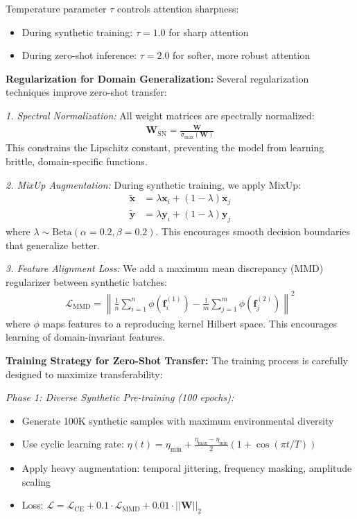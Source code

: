 \documentclass[journal]{IEEEtran}
\begin{document}
Temperature parameter $\tau$ controls attention sharpness:
\begin{itemize}
\item During synthetic training: $\tau = 1.0$ for sharp attention
\item During zero-shot inference: $\tau = 2.0$ for softer, more robust attention
\end{itemize}

\textbf{Regularization for Domain Generalization:}
Several regularization techniques improve zero-shot transfer:

\textit{1. Spectral Normalization:} All weight matrices are spectrally normalized:
\begin{align}
\mathbf{W}_{\text{SN}} = \frac{\mathbf{W}}{\sigma_{\max}(\mathbf{W})}
\end{align}
This constrains the Lipschitz constant, preventing the model from learning brittle, domain-specific functions.

\textit{2. MixUp Augmentation:} During synthetic training, we apply MixUp:
\begin{align}
\tilde{\mathbf{x}} &= \lambda \mathbf{x}_i + (1-\lambda) \mathbf{x}_j \\
\tilde{\mathbf{y}} &= \lambda \mathbf{y}_i + (1-\lambda) \mathbf{y}_j
\end{align}
where $\lambda \sim \text{Beta}(\alpha=0.2, \beta=0.2)$. This encourages smooth decision boundaries that generalize better.

\textit{3. Feature Alignment Loss:} We add a maximum mean discrepancy (MMD) regularizer between synthetic batches:
\begin{align}
\mathcal{L}_{\text{MMD}} = \left\| \frac{1}{n}\sum_{i=1}^n \phi(\mathbf{f}_i^{(1)}) - \frac{1}{m}\sum_{j=1}^m \phi(\mathbf{f}_j^{(2)}) \right\|^2
\end{align}
where $\phi$ maps features to a reproducing kernel Hilbert space. This encourages learning of domain-invariant features.

\textbf{Training Strategy for Zero-Shot Transfer:}
The training process is carefully designed to maximize transferability:

\textit{Phase 1: Diverse Synthetic Pre-training (100 epochs):}
\begin{itemize}
\item Generate 100K synthetic samples with maximum environmental diversity
\item Use cyclic learning rate: $\eta(t) = \eta_{\min} + \frac{\eta_{\max} - \eta_{\min}}{2}(1 + \cos(\pi t/T))$
\item Apply heavy augmentation: temporal jittering, frequency masking, amplitude scaling
\item Loss: $\mathcal{L} = \mathcal{L}_{\text{CE}} + 0.1 \cdot \mathcal{L}_{\text{MMD}} + 0.01 \cdot ||\mathbf{W}||_2$
\end{itemize}
\end{document}
